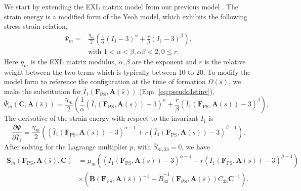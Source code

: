 	We start by extending the EXL matrix model from our previous model \cite{sacks_novel_2015}. The strain energy is a modified form of the Yeoh model, which exhibits the following stress-strain relation,
\begin{equation}
\begin{split}
\Psi_m = &\frac{\eta_m}{2} \left( \frac{1}{\alpha}\left( I_1 -3\right)^{\alpha} + \frac{r}{\beta} \left( I_1 -3\right)^{\beta} \right), \\
&\text{with } 1<\alpha<\beta, \alpha\beta <2, 0 \leq r.
\end{split}
\end{equation}
    Here $\eta_m$ is the EXL matrix modulus, $\alpha,\beta$ are the exponent and $r$ is the relative weight between the two terms which is typically between 10 to 20. To modify the model form to reference the configuration at the time of formation $\Omega(\hat{s})$, we make the substitution for $\bar{I}_1(\mathbf{F}_\mathrm{PS}, \mathbf{A}(\hat{s}))$ (Eqn. \ref{eq:pseudo1stinv}),
\begin{equation} \label{eq:matrixenergyform}
\bar{\Psi}_m\left( \mathbf{C}, \mathbf{A}(\hat{s})\right) = \frac{\eta_m}{2} \left(\frac{1}{\alpha} \left( \bar{I}_1\left(\mathbf{F}_\mathrm{PS}, \mathbf{A}(s)\right) -3\right)^\alpha +\frac{r}{\beta} \left( \bar{I}_1\left(\mathbf{F}_\mathrm{PS}, \mathbf{A}(s)\right) -3\right)^\beta \right),
\end{equation}
    The derivative of the strain energy with respect to the invariant $\bar{I}_1$ is 
\begin{equation}
\frac{\partial \bar{\Psi}}{\partial \bar{I}_1} =	\frac{\eta_m}{2} \left(\left( \bar{I}_1\left(\mathbf{F}_\mathrm{PS}, \mathbf{A}(s)\right)- 3\right)^{\alpha - 1} + r \left( \bar{I}_1\left(\mathbf{F}_\mathrm{PS}, \mathbf{A}(s)\right) - 3\right)^{\beta - 1}\right).
\end{equation}
    After solving for the Lagrange multiplier $p$, with $\bar{S}_{m,33} = 0$, we have 
\begin{equation}\label{eq:matrixfinal}
\begin{split}
\mathbf{\bar{S}}_m \left( \mathbf{F}_\mathrm{PS},\mathbf{A}(\hat{s}),\mathbf{C}\right) &= \mu_m \left(\left( \bar{I}_1\left(\mathbf{F}_\mathrm{PS}, \mathbf{A}(s)\right) - 3\right)^{\alpha - 1} + r \left( \bar{I}_1\left(\mathbf{F}_\mathrm{PS}, \mathbf{A}(s)\right) - 3\right)^{\beta - 1}\right) \\
&\times \left( \mathbf{\tilde{B}}(\mathbf{F}_\mathrm{PS}, \mathbf{A}(\hat{s}))^{-1} - \tilde{B}_{33}^{-1}(\mathbf{F}_\mathrm{PS}, \mathbf{A}(\hat{s}))C_{33}\mathbf{C}^{-1}\right).
\end{split}
\end{equation}


